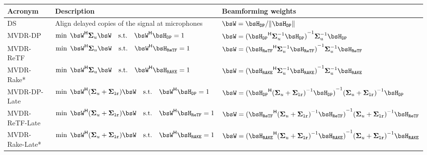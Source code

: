 \begin{tabular*}{\linewidth}{@{\extracolsep{\fill}}lll@{}}
\toprule
Acronym & Description & Beamforming weights \\
\midrule
DS              & Align delayed copies of the signal at microphones
                    &  $\bsW = \FLTS_\mathtt{DP} / \kvvbar{\FLTS_\mathtt{DP}} $ \\
MVDR-DP        & $\min\; \khermitian{\bsW} \xpsd_{u} \bsW \quad \text{s.t.} \quad \khermitian{\bsW} \FLTS_\mathtt{DP} = 1$
                    &  $\bsW = \kinv{(\khermitian{\FLTS_\mathtt{DP}} \kinv{\xpsd}_{u}  \FLTS_\mathtt{DP})} \kinv{\xpsd}_{u}  \FLTS_\mathtt{DP}$\\
MVDR-ReTF        & $\min\; \khermitian{\bsW} \xpsd_{u} \bsW \quad \text{s.t.} \quad \khermitian{\bsW} \FLTS_\mathtt{ReTF} = 1$
                    &  $\bsW = \kinv{(\khermitian{\FLTS_\mathtt{ReTF}} \kinv{\xpsd}_{u}  \FLTS_\mathtt{ReTF})} \kinv{\xpsd}_{u}  \FLTS_\mathtt{ReTF}$\\
MVDR-Rake*       & $\min\; \khermitian{\bsW} \xpsd_{u} \bsW \quad \text{s.t.} \quad \khermitian{\bsW} \FLTS_\mathtt{RAKE} = 1$
                    &  $\bsW = \kinv{(\khermitian{\FLTS_\mathtt{RAKE}} \kinv{\xpsd}_{u}  \FLTS_\mathtt{RAKE})} \kinv{\xpsd}_{u}  \FLTS_\mathtt{RAKE}$\\
MVDR-DP-Late    & $\min\; \khermitian{\bsW} (\xpsd_{u} + \xpsd_{\mathtt{lr}}) \bsW \quad \text{s.t.} \quad \khermitian{\bsW} \FLTS_{\mathtt{DP}} = 1$
                    &  $\bsW = \kinv{(\khermitian{\FLTS_\mathtt{DP}} \kinv{(\xpsd_{u} + \xpsd_{\mathtt{lr}})}  \FLTS_\mathtt{DP})} \kinv{(\xpsd_{u} + \xpsd_{\mathtt{lr}})}  \FLTS_\mathtt{DP}$      \\
MVDR-ReTF-Late   & $\min\; \khermitian{\bsW} (\xpsd_{u} + \xpsd_{\mathtt{lr}}) \bsW \quad \text{s.t.} \quad \khermitian{\bsW} \FLTS_{\mathtt{ReTF}} = 1$
                    &  $\bsW = \kinv{(\khermitian{\FLTS_\mathtt{ReTF}} \kinv{(\xpsd_{u} + \xpsd_{\mathtt{lr}})}  \FLTS_\mathtt{ReTF})} \kinv{(\xpsd_{u} + \xpsd_{\mathtt{lr}})}  \FLTS_\mathtt{ReTF}$   \\
MVDR-Rake-Late*  & $\min\; \khermitian{\bsW} (\xpsd_{u} + \xpsd_{\mathtt{lr}}) \bsW \quad \text{s.t.} \quad \khermitian{\bsW} \FLTS_{\mathtt{RAKE}} = 1$
                    &  $\bsW = \kinv{(\khermitian{\FLTS_\mathtt{RAKE}} \kinv{(\xpsd_{u} + \xpsd_{\mathtt{lr}})}  \FLTS_\mathtt{RAKE})} \kinv{(\xpsd_{u} + \xpsd_{\mathtt{lr}})}  \FLTS_\mathtt{RAKE}$\\
\bottomrule
\end{tabular*}